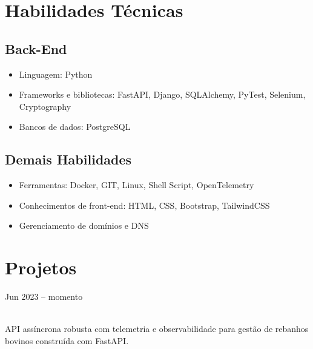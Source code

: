 \documentclass{cv}
\begin{document}
\pagestyle{empty}

\maketitle

\section{Habilidades Técnicas}

\subsection{Back-End}

\begin{itemize}
  \item Linguagem: Python
  \item Frameworks e bibliotecas: FastAPI, Django, SQLAlchemy,
    PyTest, Selenium, Cryptography
  \item Bancos de dados: PostgreSQL
\end{itemize}

\subsection{Demais Habilidades}

\begin{itemize}
  \item Ferramentas: Docker, GIT, Linux, Shell Script, OpenTelemetry
  \item Conhecimentos de front-end: HTML, CSS, Bootstrap, TailwindCSS
  \item Gerenciamento de domínios e DNS
\end{itemize}

\section{Projetos}

\hfill{Jun 2023 -- momento}\\
\\
\vspace{0.15cm}

API assíncrona robusta com telemetria e observabilidade para gestão
de rebanhos bovinos construída com FastAPI.

\vspace{0.08cm}
\end{document}
